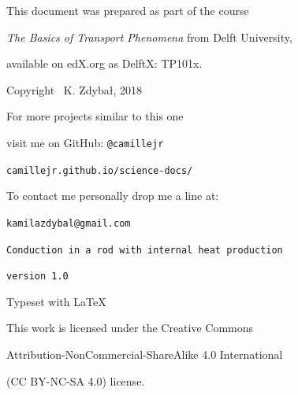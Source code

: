 \documentclass[10pt]{article}
\begin{document}
\begin{center}
\vspace*{5cm}

This document was prepared as part of the course 

\textit{The Basics of Transport Phenomena} from Delft University, 

available on edX.org as DelftX: TP101x.

Copyright \textcopyright \, K. Zdybał, 2018

For more projects similar to this one

visit me on GitHub: \verb|@camillejr|

\verb|camillejr.github.io/science-docs/|

To contact me personally drop me a line at:

\verb|kamilazdybal@gmail.com|

\vspace*{2cm}

\verb|Conduction in a rod with internal heat production|

\verb|version 1.0|

Typeset with \LaTeX

\vspace*{1.8cm}

\noindent This work is licensed under the Creative Commons

Attribution-NonCommercial-ShareAlike 4.0 International 

(CC BY-NC-SA
4.0) license.
\end{center}
\end{document}

